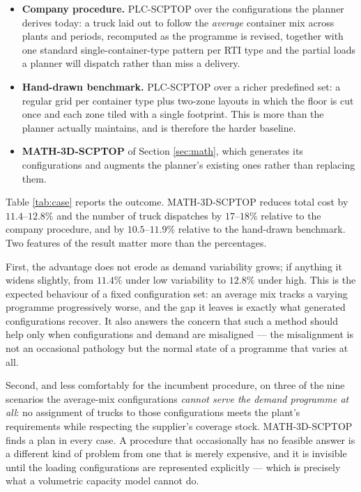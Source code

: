 {{\color{blue}
\begin{itemize}
  \item \textbf{Company procedure.} PLC-SCPTOP over the configurations the
  planner derives today: a truck laid out to follow the \emph{average}
  container mix across plants and periods, recomputed as the programme is
  revised, together with one standard single-container-type pattern per RTI
  type and the partial loads a planner will dispatch rather than miss a
  delivery.
  \item \textbf{Hand-drawn benchmark.} PLC-SCPTOP over a richer predefined
  set: a regular grid per container type plus two-zone layouts in which the
  floor is cut once and each zone tiled with a single footprint. This is more
  than the planner actually maintains, and is therefore the harder baseline.
  \item \textbf{MATH-3D-SCPTOP} of Section \ref{sec:math}, which generates
  its configurations and augments the planner's existing ones rather than
  replacing them.
\end{itemize}
}

{\color{blue}
Table \ref{tab:case} reports the outcome. MATH-3D-SCPTOP reduces total cost by
$11.4$--$12.8\%$ and the number of truck dispatches by $17$--$18\%$ relative to
the company procedure, and by $10.5$--$11.9\%$ relative to the hand-drawn
benchmark. Two features of the result matter more than the percentages.
}

{\color{blue}
First, the advantage does not erode as demand variability grows; if anything it
widens slightly, from $11.4\%$ under low variability to $12.8\%$ under high.
This is the expected behaviour of a fixed configuration set: an average mix
tracks a varying programme progressively worse, and the gap it leaves is
exactly what generated configurations recover. It also answers the concern
that such a method should help only when configurations and demand are
misaligned --- the misalignment is not an occasional pathology but the normal
state of a programme that varies at all.
}

{\color{blue}
Second, and less comfortably for the incumbent procedure, on three of the nine
scenarios the average-mix configurations \emph{cannot serve the demand
programme at all}: no assignment of trucks to those configurations meets the
plant's requirements while respecting the supplier's coverage stock.
MATH-3D-SCPTOP finds a plan in every case. A procedure that occasionally has
no feasible answer is a different kind of problem from one that is merely
expensive, and it is invisible until the loading configurations are represented
explicitly --- which is precisely what a volumetric capacity model cannot do.
}

}
